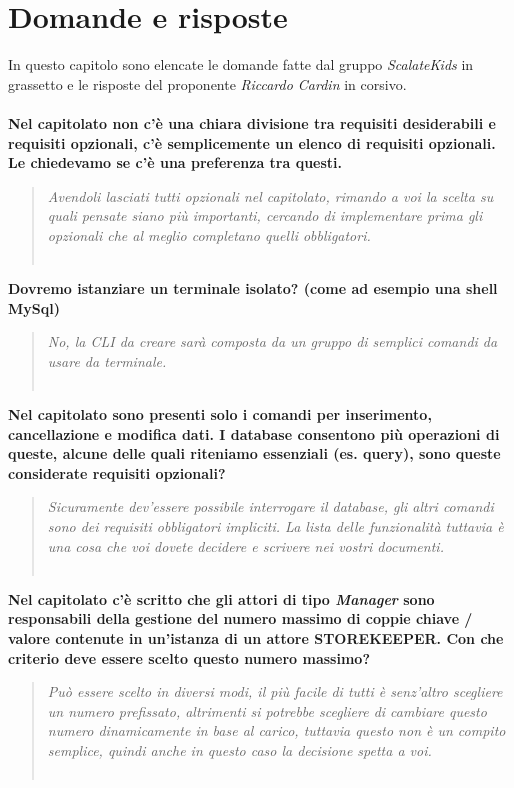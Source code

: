 \documentclass{scalatekids-article}
\begin{document}
\section{Domande e risposte}
In questo capitolo sono elencate le domande fatte dal gruppo \textit{ScalateKids} in grassetto e le risposte del proponente \textit{Riccardo Cardin} in corsivo.
\textbf{\\ \\Nel capitolato non c'è una chiara divisione tra requisiti desiderabili e requisiti opzionali, c'è semplicemente un elenco di requisiti opzionali. Le chiedevamo se c'è una preferenza tra questi.}
\begin{quote}
  \textit{Avendoli lasciati tutti opzionali nel capitolato, rimando a voi la scelta su quali pensate siano più importanti, cercando di implementare prima gli opzionali che al meglio completano quelli obbligatori.\\ \\}
\end{quote}
\textbf{Dovremo istanziare un terminale isolato? (come ad esempio una shell MySql)}
\begin{quote}
  \textit{No, la CLI da creare sarà composta da un gruppo di semplici comandi da usare da terminale.\\ \\}
\end{quote}
\textbf{Nel capitolato sono presenti solo i comandi per inserimento, cancellazione e modifica dati. I database consentono più operazioni di queste, alcune delle quali riteniamo essenziali (es. query), sono queste considerate requisiti opzionali?}
\begin{quote}
  \textit{Sicuramente dev'essere possibile interrogare il database, gli altri comandi sono dei requisiti obbligatori impliciti. La lista delle funzionalità tuttavia è una cosa che voi dovete decidere e scrivere nei vostri documenti.\\ \\}
\end{quote}
\textbf{Nel capitolato c'è scritto che gli attori di tipo \textit{Manager} sono responsabili della gestione del numero massimo di coppie chiave / valore contenute in un’istanza di un attore STOREKEEPER. Con che criterio deve essere scelto questo numero massimo?}
\begin{quote}
  \textit{Può essere scelto in diversi modi, il più facile di tutti è senz'altro scegliere un numero prefissato, altrimenti si potrebbe scegliere di cambiare questo numero dinamicamente in base al carico, tuttavia questo non è un compito semplice, quindi anche in questo caso la decisione spetta a voi.\\ \\}
\end{quote}
\end{document}
